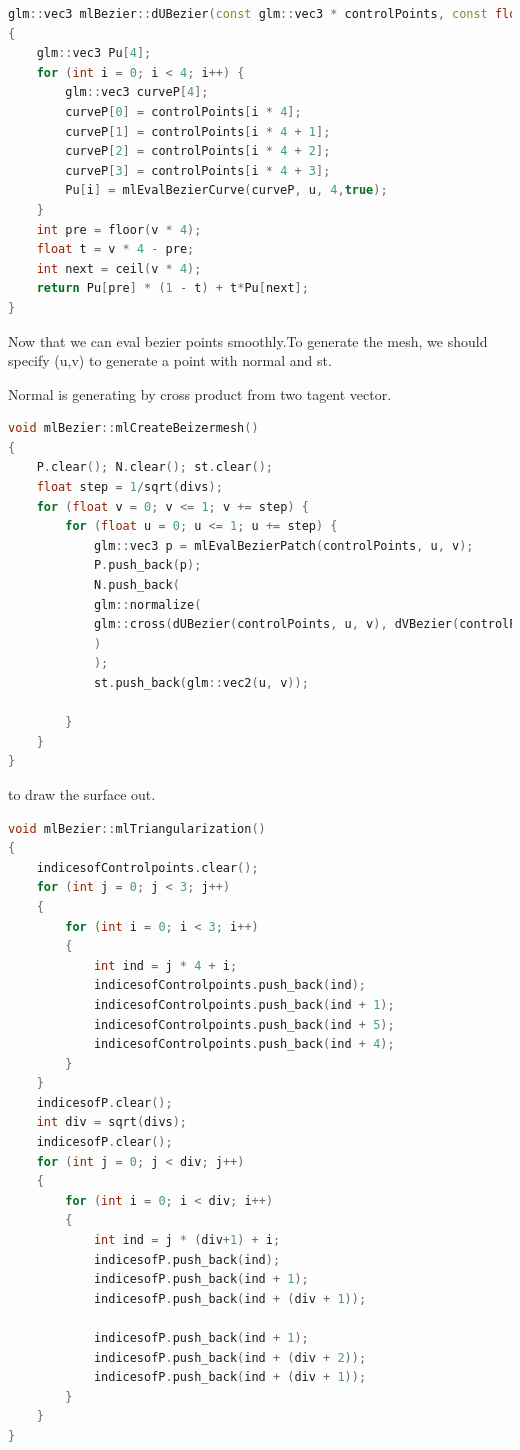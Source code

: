 \documentclass[acmtog]{acmart}
\begin{document}
\begin{lstlisting}[frame=single,breaklines=true,language=c++,basicstyle=\footnotesize\ttfamily]
glm::vec3 mlBezier::dUBezier(const glm::vec3 * controlPoints, const float & u, const float & v)
{
	glm::vec3 Pu[4];
	for (int i = 0; i < 4; i++) {
		glm::vec3 curveP[4];
		curveP[0] = controlPoints[i * 4];
		curveP[1] = controlPoints[i * 4 + 1];
		curveP[2] = controlPoints[i * 4 + 2];
		curveP[3] = controlPoints[i * 4 + 3];
		Pu[i] = mlEvalBezierCurve(curveP, u, 4,true);
	}
	int pre = floor(v * 4);
	float t = v * 4 - pre;
	int next = ceil(v * 4);
	return Pu[pre] * (1 - t) + t*Pu[next];
}
\end{lstlisting}
\par Now that we can eval bezier points smoothly.To generate the mesh, we should specify (u,v) to generate a point with normal and st.
\par Normal is generating by cross product from two tagent vector.
\begin{lstlisting}[frame=single,breaklines=true,language=c++,basicstyle=\footnotesize\ttfamily]
void mlBezier::mlCreateBeizermesh()
{
	P.clear(); N.clear(); st.clear();
	float step = 1/sqrt(divs);
	for (float v = 0; v <= 1; v += step) {
		for (float u = 0; u <= 1; u += step) {
			glm::vec3 p = mlEvalBezierPatch(controlPoints, u, v);
			P.push_back(p);
			N.push_back(
			glm::normalize(
			glm::cross(dUBezier(controlPoints, u, v), dVBezier(controlPoints, u, v))
			)
			);
			st.push_back(glm::vec2(u, v));
			
		}
	}
}
\end{lstlisting}
\par to draw the surface out.
\begin{lstlisting}[frame=single,breaklines=true,language=c++,basicstyle=\footnotesize\ttfamily]
void mlBezier::mlTriangularization()
{
	indicesofControlpoints.clear();
	for (int j = 0; j < 3; j++)
	{
		for (int i = 0; i < 3; i++)
		{
			int ind = j * 4 + i;
			indicesofControlpoints.push_back(ind);
			indicesofControlpoints.push_back(ind + 1);
			indicesofControlpoints.push_back(ind + 5);
			indicesofControlpoints.push_back(ind + 4);
		}
	}
	indicesofP.clear();
	int div = sqrt(divs);
	indicesofP.clear();
	for (int j = 0; j < div; j++)
	{
		for (int i = 0; i < div; i++)
		{
			int ind = j * (div+1) + i;
			indicesofP.push_back(ind);
			indicesofP.push_back(ind + 1);
			indicesofP.push_back(ind + (div + 1));
			
			indicesofP.push_back(ind + 1);
			indicesofP.push_back(ind + (div + 2));
			indicesofP.push_back(ind + (div + 1));
		}
	}
}
\end{lstlisting}
\end{document}

